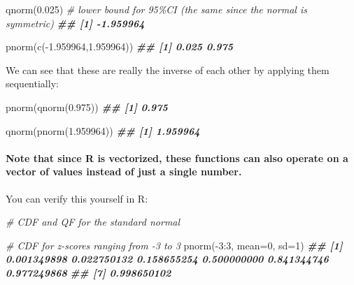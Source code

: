 \documentclass[
]{article}
\newenvironment{Shaded}{\begin{snugshade}}{\end{snugshade}}
\newcommand{\AttributeTok}[1]{\textcolor[rgb]{0.77,0.63,0.00}{#1}}
\newcommand{\CommentTok}[1]{\textcolor[rgb]{0.56,0.35,0.01}{\textit{#1}}}
\newcommand{\DecValTok}[1]{\textcolor[rgb]{0.00,0.00,0.81}{#1}}
\newcommand{\DocumentationTok}[1]{\textcolor[rgb]{0.56,0.35,0.01}{\textbf{\textit{#1}}}}
\newcommand{\FloatTok}[1]{\textcolor[rgb]{0.00,0.00,0.81}{#1}}
\newcommand{\FunctionTok}[1]{\textcolor[rgb]{0.00,0.00,0.00}{#1}}
\newcommand{\NormalTok}[1]{#1}
\newcommand{\SpecialCharTok}[1]{\textcolor[rgb]{0.00,0.00,0.00}{#1}}
\begin{document}
\begin{Shaded}
\begin{Highlighting}[]
\FunctionTok{qnorm}\NormalTok{(}\FloatTok{0.025}\NormalTok{) }\CommentTok{\# lower bound for 95\%CI (the same since the normal is symmetric)}
\DocumentationTok{\#\# [1] {-}1.959964}
\end{Highlighting}
\end{Shaded}

\begin{Shaded}
\begin{Highlighting}[]

\FunctionTok{pnorm}\NormalTok{(}\FunctionTok{c}\NormalTok{(}\SpecialCharTok{{-}}\FloatTok{1.959964}\NormalTok{,}\FloatTok{1.959964}\NormalTok{))}
\DocumentationTok{\#\# [1] 0.025 0.975}
\end{Highlighting}
\end{Shaded}

We can see that these are really the inverse of each other by applying
them sequentially:

\begin{Shaded}
\begin{Highlighting}[]
\FunctionTok{pnorm}\NormalTok{(}\FunctionTok{qnorm}\NormalTok{(}\FloatTok{0.975}\NormalTok{))}
\DocumentationTok{\#\# [1] 0.975}
\end{Highlighting}
\end{Shaded}

\begin{Shaded}
\begin{Highlighting}[]
\FunctionTok{qnorm}\NormalTok{(}\FunctionTok{pnorm}\NormalTok{(}\FloatTok{1.959964}\NormalTok{))}
\DocumentationTok{\#\# [1] 1.959964}
\end{Highlighting}
\end{Shaded}

\hypertarget{note-that-since-r-is-vectorized-these-functions-can-also-operate-on-a-vector-of-values-instead-of-just-a-single-number.}{%
\paragraph{Note that since R is vectorized, these functions can also
operate on a vector of values instead of just a single
number.}\label{note-that-since-r-is-vectorized-these-functions-can-also-operate-on-a-vector-of-values-instead-of-just-a-single-number.}}

You can verify this yourself in R:

\begin{Shaded}
\begin{Highlighting}[]
\CommentTok{\# CDF and QF for the standard normal}

\CommentTok{\# CDF for z{-}scores ranging from {-}3 to 3}
\FunctionTok{pnorm}\NormalTok{(}\SpecialCharTok{{-}}\DecValTok{3}\SpecialCharTok{:}\DecValTok{3}\NormalTok{, }\AttributeTok{mean=}\DecValTok{0}\NormalTok{, }\AttributeTok{sd=}\DecValTok{1}\NormalTok{)}
\DocumentationTok{\#\# [1] 0.001349898 0.022750132 0.158655254 0.500000000 0.841344746 0.977249868}
\DocumentationTok{\#\# [7] 0.998650102}
\end{Highlighting}
\end{Shaded}
\end{document}
